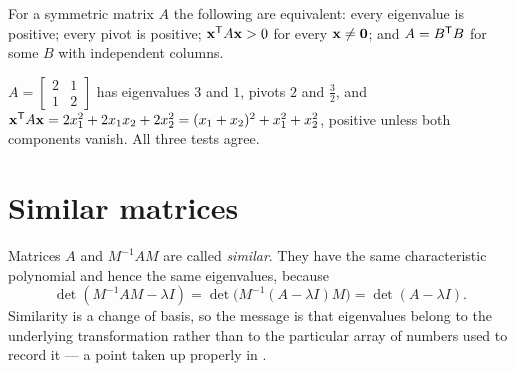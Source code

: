 \begin{proposition}
For a symmetric matrix \(A\) the following are equivalent: every eigenvalue is
positive; every pivot is positive; \(\mathbf{x}^{\mathsf{T}} A\mathbf{x}>0\) for every
\(\mathbf{x}\neq\mathbf{0}\); and \(A=B^{\mathsf{T}} B\) for some \(B\) with independent
columns.
\end{proposition}

\begin{example}
\(A=\begin{bmatrix}2&1\\1&2\end{bmatrix}\) has eigenvalues \(3\) and \(1\),
pivots \(2\) and \(\tfrac32\), and
\(\mathbf{x}^{\mathsf{T}} A\mathbf{x}=2x_1^{2}+2x_1x_2+2x_2^{2}=(x_1+x_2)^{2}+x_1^{2}+x_2^{2}\),
positive unless both components vanish. All three tests agree.
\end{example}


\section{Similar matrices}

Matrices \(A\) and \(M^{-1}AM\) are called \emph{similar}. They have the same
characteristic polynomial and hence the same eigenvalues, because
\[
	\det(M^{-1}AM-\lambda I)=\det\bigl(M^{-1}(A-\lambda I)M\bigr)=\det(A-\lambda I).
\]
Similarity is a change of basis, so the message is that eigenvalues belong to
the underlying transformation rather than to the particular array of numbers
used to record it --- a point taken up properly in
.
